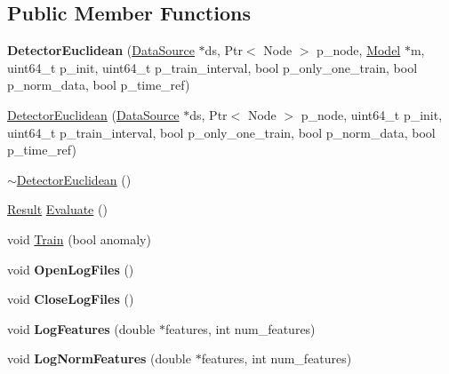 \subsection*{Public Member Functions}
\begin{DoxyCompactItemize}
\item 
\hypertarget{classns3_1_1DetectorEuclidean_a2a694d45afca08e38deb3e007dcee77b}{}{\bfseries Detector\+Euclidean} (\hyperlink{classns3_1_1DataSource}{Data\+Source} $\ast$ds, Ptr$<$ Node $>$ p\+\_\+node, \hyperlink{classns3_1_1Model}{Model} $\ast$m, uint64\+\_\+t p\+\_\+init, uint64\+\_\+t p\+\_\+train\+\_\+interval, bool p\+\_\+only\+\_\+one\+\_\+train, bool p\+\_\+norm\+\_\+data, bool p\+\_\+time\+\_\+ref)\label{classns3_1_1DetectorEuclidean_a2a694d45afca08e38deb3e007dcee77b}

\item 
\hyperlink{classns3_1_1DetectorEuclidean_af8f045a306bb4235bd70c86564cd8255}{Detector\+Euclidean} (\hyperlink{classns3_1_1DataSource}{Data\+Source} $\ast$ds, Ptr$<$ Node $>$ p\+\_\+node, uint64\+\_\+t p\+\_\+init, uint64\+\_\+t p\+\_\+train\+\_\+interval, bool p\+\_\+only\+\_\+one\+\_\+train, bool p\+\_\+norm\+\_\+data, bool p\+\_\+time\+\_\+ref)
\item 
\hyperlink{classns3_1_1DetectorEuclidean_ac4242ccbaae19cd3775333df55e25573}{$\sim$\+Detector\+Euclidean} ()
\item 
\hyperlink{structns3_1_1Result}{Result} \hyperlink{classns3_1_1DetectorEuclidean_a1668cc11effae9dca3e6e83e13421435}{Evaluate} ()
\item 
void \hyperlink{classns3_1_1DetectorEuclidean_aa64ef1d41c1182f4825af495e9bcb039}{Train} (bool anomaly)
\item 
\hypertarget{classns3_1_1DetectorEuclidean_a8135fe34471fcffeaf47316529f4e22b}{}void {\bfseries Open\+Log\+Files} ()\label{classns3_1_1DetectorEuclidean_a8135fe34471fcffeaf47316529f4e22b}

\item 
\hypertarget{classns3_1_1DetectorEuclidean_a784cbc08c217860bb086678b1d29436b}{}void {\bfseries Close\+Log\+Files} ()\label{classns3_1_1DetectorEuclidean_a784cbc08c217860bb086678b1d29436b}

\item 
\hypertarget{classns3_1_1DetectorEuclidean_a29abb726566683864c1912e740cc440e}{}void {\bfseries Log\+Features} (double $\ast$features, int num\+\_\+features)\label{classns3_1_1DetectorEuclidean_a29abb726566683864c1912e740cc440e}

\item 
\hypertarget{classns3_1_1DetectorEuclidean_a67dc448d211d6d91095a89960dfa95ae}{}void {\bfseries Log\+Norm\+Features} (double $\ast$features, int num\+\_\+features)\label{classns3_1_1DetectorEuclidean_a67dc448d211d6d91095a89960dfa95ae}


\end{DoxyCompactItemize}
